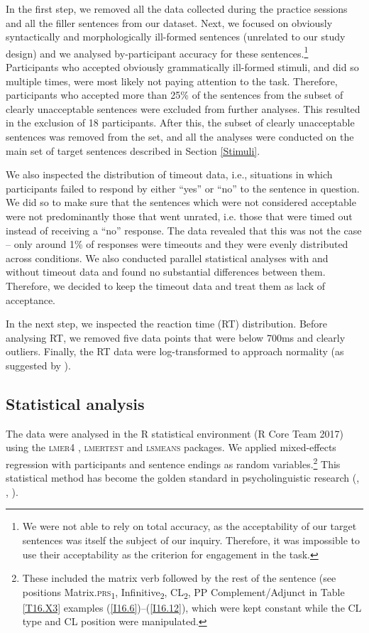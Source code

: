 In the first step, we removed all the data collected during the practice sessions and all the filler sentences from our dataset. Next, we focused on obviously syntactically and morphologically ill-formed sentences (unrelated to our study design) and we analysed by-participant accuracy for these sentences.\footnote{We were not able to rely on total accuracy, as the acceptability of our target sentences was itself the subject of our inquiry. Therefore, it was impossible to use their acceptability as the criterion for engagement in the task.} Participants who accepted obviously grammatically ill-formed stimuli, and did so multiple times, were most likely not paying attention to the task. Therefore, participants who accepted more than 25\% of the sentences from the subset of clearly unacceptable sentences were excluded from further analyses. This resulted in the exclusion of 18 participants. After this, the subset of clearly unacceptable sentences was removed from the set, and all the analyses were conducted on the main set of target sentences described in Section \ref{Stimuli}.

We also inspected the distribution of timeout data, i.e., situations in which participants failed to respond by either “yes” or “no” to the sentence in question. We did so to make sure that the sentences which were not considered acceptable were not predominantly those that went unrated, i.e. those that were timed out instead of receiving a “no” response. The data revealed that this was not the case – only around 1\% of responses were timeouts and they were evenly distributed across conditions. We also conducted parallel statistical analyses with and without timeout data and found no substantial differences between them. Therefore, we decided to keep the timeout data and treat them as lack of acceptance.

In the next step, we inspected the reaction time (RT) distribution. Before a\-na\-ly\-sing RT, we removed five data points that were below 700ms and clearly outliers. Finally, the RT data were log-transformed to approach normality (as suggested by \citealt[][]{BaayenMilin10}).

\subsection{Statistical analysis}
\label{{Statistical analysis}}
The data were analysed in the R statistical environment (R Core Team 2017) using the \textsc{lmer}4 \citep[][]{BMBW15}, \textsc{lmertest} \citep[][]{KBC17} and \textsc{lsmeans} \citep[][]{Lenth16} packages. We applied mixed-effects regression with participants and sentence endings as random variables.\footnote{These included the matrix verb followed by the rest of the sentence (see positions Matrix.\textsc{prs}\textsubscript{1}, Infinitive\textsubscript{2}, CL\textsubscript{2}, PP Complement/Adjunct in Table \ref{T16.X3} examples (\ref{I16.6})--(\ref{I16.12}), which were kept constant while the CL type and CL position were manipulated.} This statistical method has become the golden standard in psycholinguistic research (\citealt[][]{Baayen12}, \citealt[][]{BDB08}, \citealt[][]{Jaeger08}). 

